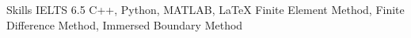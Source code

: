 
\begin{rubric}{Skills}
\entry*[Languages]
	IELTS 6.5
    C++, Python, MATLAB, \LaTeX
\entry*[Numerical]
    Finite Element Method, 
	Finite Difference Method, 
	Immersed Boundary Method
\end{rubric}
